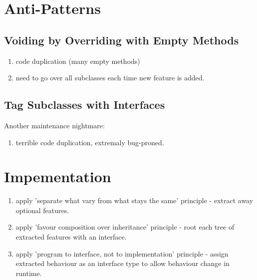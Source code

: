 \documentclass{report}
\begin{document}
 
\section{Anti-Patterns}

\subsection{Voiding by Overriding with Empty Methods}
\begin{enumerate}
  \item code duplication (many empty methods)
  \item need to go over all subclasses each time new feature is added.
\end{enumerate}

\subsection{Tag Subclasses with Interfaces}
Another maintenance nightmare:
\begin{enumerate}
  \item terrible code duplication, extremaly bug-proned.
\end{enumerate}


\section{Impementation}
\begin{enumerate}
  \item apply 'separate what vary from what stays the same' principle - extract away optional features.
  \item apply 'favour composition over inheritance' principle - root each tree of extracted features with an
  interface.
  \item apply 'program to interface, not to implementation' principle - assign extracted behaviour as an 
  interface type to allow behaviour change in runtime.
\end{enumerate}
\end{document}
